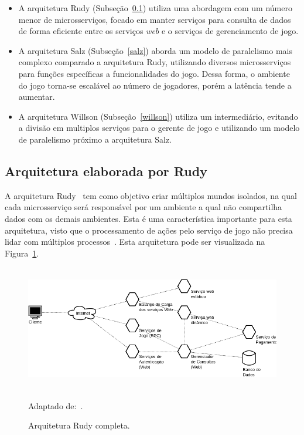 \begin{itemize}
 \item A arquitetura Rudy (Subseção~\ref{rudy}) utiliza uma abordagem com um número menor de microsserviços, focado em manter serviços para consulta de dados de forma eficiente entre os serviços \textit{web} e o serviços de gerenciamento de jogo.
 \item A arquitetura Salz (Subseção~\ref{salz}) aborda um modelo de paralelismo mais complexo comparado a arquitetura Rudy, utilizando diversos microsserviços para funções específicas a funcionalidades do jogo.
%
Dessa forma, o ambiente do jogo torna-se escalável ao número de jogadores, porém a latência tende a aumentar.
\item A arquitetura Willson (Subseção~\ref{willson}) utiliza um intermediário, evitando a divisão em multiplos serviços para o gerente de jogo e utilizando um modelo de paralelismo próximo a arquitetura Salz.
\end{itemize}










\subsection{Arquitetura elaborada por Rudy}
\label{rudy}


A arquitetura Rudy~\cite{matthiasrudy2011} tem como objetivo criar múltiplos mundos isolados, na qual cada microsserviço será responsável por um ambiente a qual não compartilha dados com os demais ambientes.
%
Esta é uma característica importante para esta arquitetura, visto que o processamento de ações pelo serviço de jogo não precisa lidar com múltiplos processos~\cite{matthiasrudy2011}.
%
Esta arquitetura pode ser visualizada na Figura~\ref{full_rudy}.

\begin{figure}[htb!]
  \caption{Arquitetura Rudy completa.}
  \label{full_rudy}
  \includegraphics[height=5.5cm]{arquiteturas/full_rudy.png}
  \centering

  Adaptado de:~\cite{matthiasrudy2011}.
\end{figure}


